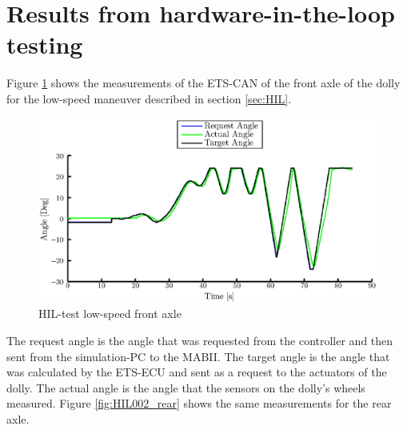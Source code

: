 \documentclass[ExampleMasters.tex]{subfiles}
\begin{document}
\section{Results from hardware-in-the-loop testing}

Figure \ref{fig:HIL002_front} shows the measurements of the ETS-CAN of the front axle of the dolly for the low-speed maneuver described in section \ref{sec:HIL}.\\

\begin{figure}[!htb]
	\centering
	\includegraphics[width=1\linewidth]{figures/HIL002_front}
	\caption{HIL-test low-speed front axle}
	
	\label{fig:HIL002_front}
\end{figure}

The request angle is the angle that was requested from the controller and then sent from the simulation-PC to the MABII. The target angle is the angle that was calculated by the ETS-ECU and sent as a request to the actuators of the dolly. The actual angle is the angle that the sensors on the dolly's wheels measured.
Figure \ref{fig:HIL002_rear} shows the same measurements for the rear axle.
\end{document}
